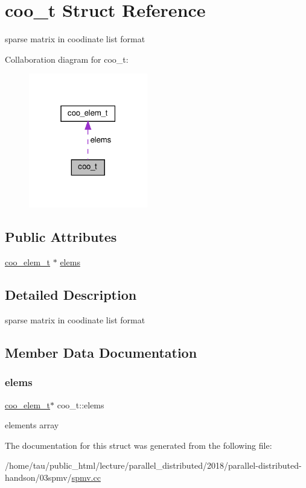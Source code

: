 \hypertarget{structcoo__t}{}\section{coo\+\_\+t Struct Reference}
\label{structcoo__t}


sparse matrix in coodinate list format  




Collaboration diagram for coo\+\_\+t\+:\nopagebreak
\begin{figure}[H]
\begin{center}
\leavevmode
\includegraphics[width=147pt]{structcoo__t__coll__graph}
\end{center}
\end{figure}
\subsection*{Public Attributes}
\begin{DoxyCompactItemize}
\item 
\hyperlink{structcoo__elem__t}{coo\+\_\+elem\+\_\+t} $\ast$ \hyperlink{structcoo__t_a3e74f1e3dadd34e5439f859fab277b54}{elems}
\end{DoxyCompactItemize}


\subsection{Detailed Description}
sparse matrix in coodinate list format 

\subsection{Member Data Documentation}
\mbox{\label{structcoo__t_a3e74f1e3dadd34e5439f859fab277b54}} 
\subsubsection{\texorpdfstring{elems}{elems}}
{\footnotesize\ttfamily \hyperlink{structcoo__elem__t}{coo\+\_\+elem\+\_\+t}$\ast$ coo\+\_\+t\+::elems}

elements array 

The documentation for this struct was generated from the following file\+:\begin{DoxyCompactItemize}
\item 
/home/tau/public\+\_\+html/lecture/parallel\+\_\+distributed/2018/parallel-\/distributed-\/handson/03spmv/\hyperlink{spmv_8cc}{spmv.\+cc}\end{DoxyCompactItemize}
